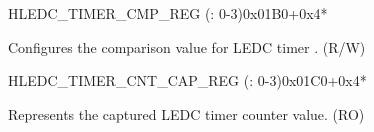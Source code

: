 \begin{register}{H}{LEDC\_TIMER\_CMP\_REG (: 0-3)}{0x01B0+0x4*}\label{regdesc:LEDCTIMERXCMPREG}
%
%
\regnewline%
\begin{regdesc}\begin{reglist}
\label{fielddesc:LEDCTIMERXCMP}\item [LEDC\_TIMER\regindex{x}\_CMP] Configures the comparison value for LEDC timer . (R/W)
\end{reglist}\end{regdesc}
\end{register}


\begin{register}{H}{LEDC\_TIMER\_CNT\_CAP\_REG (: 0-3)}{0x01C0+0x4*}\label{regdesc:LEDCTIMERXCNTCAPREG}
%
%
\regnewline%
\begin{regdesc}\begin{reglist}
\label{fielddesc:LEDCTIMERXCNTCAP}\item [LEDC\_TIMER\regindex{x}\_CNT\_CAP] Represents the captured LEDC timer  counter value. (RO)
\end{reglist}\end{regdesc}
\end{register}


